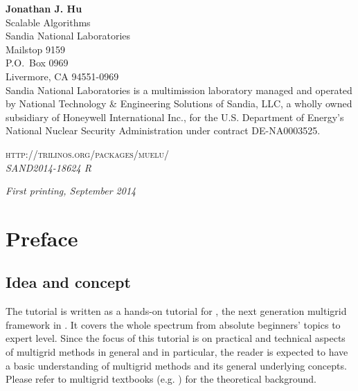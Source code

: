 \documentclass[10pt,fleqn]{book}
\begin{document}
\noindent \textbf{Jonathan J. Hu} \\
Scalable Algorithms \\
Sandia National Laboratories\\
Mailstop 9159 \\
P.O.~Box 0969 \\
Livermore, CA 94551-0969\\

\noindent Sandia National Laboratories is a multimission laboratory
managed and operated by National Technology \& Engineering Solutions
of Sandia, LLC, a wholly owned subsidiary of Honeywell International
Inc., for the U.S. Department of Energy’s National Nuclear Security
Administration under contract DE-NA0003525.


%
%

%



\noindent \textsc{http://trilinos.org/packages/muelu/}\\ %

\noindent \textit{SAND2014-18624 R}

\noindent \textit{First printing, September 2014} %


\chapter*{Preface}

\section*{Idea and concept}
The \muelu tutorial is written as a hands-on tutorial for \muelu, the next generation multigrid framework in \trilinos. It covers the whole spectrum from absolute beginners' topics to expert level. Since the focus of this tutorial is on practical and technical aspects of multigrid methods in general and \muelu in particular, the reader is expected to have a basic understanding of multigrid methods and its general underlying concepts. Please refer to multigrid textbooks (e.g. \cite{briggs}) for the theoretical background.
\end{document}
